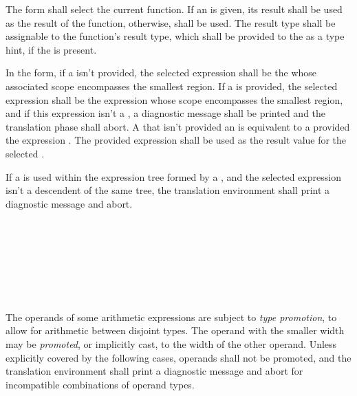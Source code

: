 \specsubsubitem
The  form shall select the current function. If an
 is given, its result shall be used as the result of the
function, otherwise,  shall be used. The result type shall be
assignable to the function's result type, which shall be provided to the
 as a type hint, if the  is
present.

\specsubsubitem
In the  form, if a  isn't
provided, the selected expression shall be the 
whose associated scope encompasses the smallest region. If a 
is provided, the selected expression shall be the expression whose scope
encompasses the smallest region, and if this expression isn't a
, a diagnostic message shall be printed and the
translation phase shall abort. A  that isn't
provided an  is equivalent to a
 provided the expression . The
provided expression shall be used as the result value for the selected
.


\specsubsubitem
If a  is used within the expression tree formed
by a , and the selected expression isn't a
descendent of the same tree, the translation environment shall print a
diagnostic message and abort.


\begin{grammar}
 \\
	 \\
	 \\
	 \\
	 \\
	 \\
\end{grammar}


\specsubitem
The operands of some arithmetic expressions are subject to \textit{type
promotion}, to allow for arithmetic between disjoint types. The operand with the
smaller width may be \textit{promoted}, or implicitly cast, to the width of the
other operand. Unless explicitly covered by the following cases, operands shall
not be promoted, and the translation environment shall print a diagnostic
message and abort for incompatible combinations of operand types.

